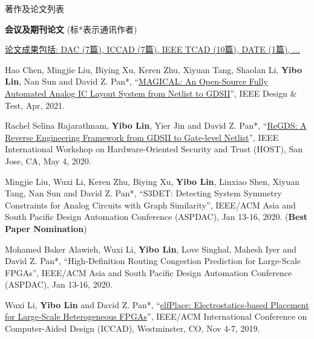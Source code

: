 \begin{rSection}{著作及论文列表}
\begin{description}[font=\normalfont, rightmargin=2em]
\end{description}
    

\textbf{会议及期刊论文} (标*表示通讯作者)
        

            \underline{论文成果包括: DAC (7篇), ICCAD (7篇), IEEE TCAD (10篇), DATE (1篇), ...} 
    

\begin{description}[font=\normalfont, rightmargin=2em]
    

\item[{[J52]}]{
        Hao Chen, Mingjie Liu, Biying Xu, Keren Zhu, Xiyuan Tang, Shaolan Li, \textbf{Yibo Lin}, Nan Sun and David Z. Pan*, 
    ``\href{https://doi.org/10.1109/MDAT.2020.3024153}{MAGICAL: An Open-Source Fully Automated Analog IC Layout System from Netlist to GDSII}'', 
    IEEE Design \& Test, Apr, 2021.
    
}
            

\item[{[C51]}]{
        Rachel Selina Rajarathnam, \textbf{Yibo Lin}, Yier Jin and David Z. Pan*, 
    ``\href{https://doi.org/10.1109/HOST45689.2020.9300272}{ReGDS: A Reverse Engineering Framework from GDSII to Gate-level Netlist}'', 
    IEEE International Workshop on Hardware-Oriented Security and Trust (HOST), San Jose, CA, May 4, 2020.
    
}
            

\item[{[C50]}]{
        Mingjie Liu, Wuxi Li, Keren Zhu, Biying Xu, \textbf{Yibo Lin}, Linxiao Shen, Xiyuan Tang, Nan Sun and David Z. Pan*, 
    ``S3DET: Detecting System Symmetry Constraints for Analog Circuits with Graph Similarity'', 
    IEEE/ACM Asia and South Pacific Design Automation Conference (ASPDAC), Jan 13-16, 2020.
    (\textbf{Best Paper Nomination})
}
            

\item[{[C49]}]{
        Mohamed Baker Alawieh, Wuxi Li, \textbf{Yibo Lin}, Love Singhal, Mahesh Iyer and David Z. Pan*, 
    ``High-Definition Routing Congestion Prediction for Large-Scale FPGAs'', 
    IEEE/ACM Asia and South Pacific Design Automation Conference (ASPDAC), Jan 13-16, 2020.
    
}
            

\item[{[C48]}]{
        Wuxi Li, \textbf{Yibo Lin} and David Z. Pan*, 
    ``\href{https://doi.org/10.1109/ICCAD45719.2019.8942075}{elfPlace: Electrostatics-based Placement for Large-Scale Heterogeneous FPGAs}'', 
    IEEE/ACM International Conference on Computer-Aided Design (ICCAD), Westminster, CO, Nov 4-7, 2019.
    
}
\end{description}
\end{rSection}
